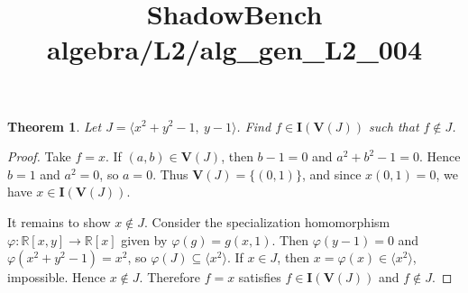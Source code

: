 \documentclass{article}
\title{ShadowBench algebra/L2/alg\_gen\_L2\_004}
\newtheorem{theorem}{Theorem}
\begin{document}
\maketitle

\begin{theorem}
Let $J=\langle x^2+y^2-1,\ y-1\rangle$. Find $f\in \mathbf I(\mathbf V(J))$ such that $f\notin J$.
\end{theorem}

\begin{proof}
Take \(f=x\). If \((a,b)\in \mathbf V(J)\), then \(b-1=0\) and
\(a^2+b^2-1=0\). Hence \(b=1\) and \(a^2=0\), so \(a=0\). Thus
\(\mathbf V(J)=\{(0,1)\}\), and since \(x(0,1)=0\), we have
\(x\in \mathbf I(\mathbf V(J))\).

It remains to show \(x\notin J\). Consider the specialization homomorphism
\(\varphi:\mathbb R[x,y]\to\mathbb R[x]\) given by \(\varphi(g)=g(x,1)\).
Then \(\varphi(y-1)=0\) and \(\varphi(x^2+y^2-1)=x^2\), so
\(\varphi(J)\subseteq \langle x^2\rangle\). If \(x\in J\), then
\(x=\varphi(x)\in\langle x^2\rangle\), impossible. Hence \(x\notin J\).
Therefore \(f=x\) satisfies \(f\in\mathbf I(\mathbf V(J))\) and \(f\notin J\).
\end{proof}
\end{document}
